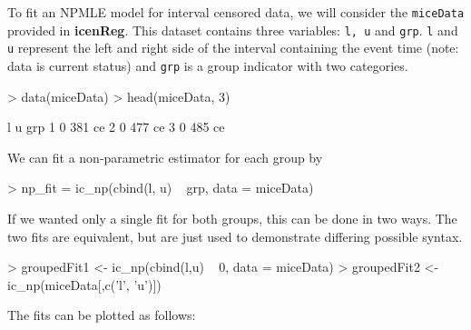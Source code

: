 \documentclass[a4paper]{article}
\begin{document}
  
To fit an NPMLE model for interval censored data, we will consider the \texttt{miceData} provided in {\bf icenReg}. This dataset contains three variables: \texttt{l, u} and \texttt{grp}. \texttt{l} and \texttt{u} represent the left and right side of the interval containing the event time (note: data is current status) and \texttt{grp} is a group indicator with two categories.

  
\begin{Schunk}
\begin{Sinput}
> data(miceData)
> head(miceData, 3)
\end{Sinput}
\begin{Soutput}
  l   u grp
1 0 381  ce
2 0 477  ce
3 0 485  ce
\end{Soutput}
\end{Schunk}
  
We can fit a non-parametric estimator for each group by 

\begin{Schunk}
\begin{Sinput}
> np_fit = ic_np(cbind(l, u) ~ grp, data = miceData)
\end{Sinput}
\end{Schunk}

If we wanted only a single fit for both groups, this can be done in two ways. The two fits are equivalent, but are just used to demonstrate differing possible syntax. 
  
\begin{Schunk}
\begin{Sinput}
> groupedFit1 <- ic_np(cbind(l,u) ~ 0, data = miceData)
> groupedFit2 <- ic_np(miceData[,c('l', 'u')])
\end{Sinput}
\end{Schunk}

The fits can be plotted as follows:
\end{document}
